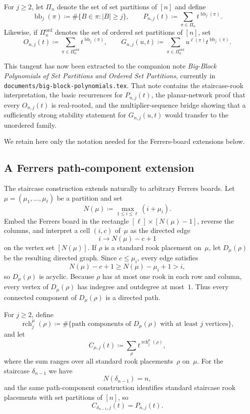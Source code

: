 \documentclass[11pt,reqno]{amsart}
\theoremstyle{definition}
\begin{document}
For $j \geq 2$, let $\Pi_n$ denote the set of set partitions of $[n]$ and define
\[
  \operatorname{bb}_j(\pi)
  \coloneqq
  \#\{B \in \pi : |B| \geq j\},
  \qquad
  P_{n,j}(t)
  \coloneqq
  \sum_{\pi \in \Pi_n} t^{\operatorname{bb}_j(\pi)}.
\]
Likewise, if $\Pi_n^{\operatorname{ord}}$ denotes the set of ordered set
partitions of $[n]$, set
\[
  O_{n,j}(t)
  \coloneqq
  \sum_{\pi \in \Pi_n^{\operatorname{ord}}} t^{\operatorname{bb}_j(\pi)},
  \qquad
  G_{n,j}(u,t)
  \coloneqq
  \sum_{\pi \in \Pi_n^{\operatorname{ord}}}
  u^{\ell(\pi)} t^{\operatorname{bb}_j(\pi)}.
\]

This tangent has now been extracted to the companion note
\emph{Big-Block Polynomials of Set Partitions and Ordered Set Partitions},
currently in \texttt{documents/big-block-polynomials.tex}. That note contains the
staircase-rook interpretation, the basic recurrences for \(P_{n,j}(t)\), the
planar-network proof that every \(O_{n,j}(t)\) is real-rooted, and the
multiplier-sequence bridge showing that a sufficiently strong stability
statement for \(G_{n,j}(u,t)\) would transfer to the unordered family.

We retain here only the notation needed for the Ferrers-board extensions below.

\subsection{A Ferrers path-component extension}

The staircase construction extends naturally to arbitrary Ferrers boards.
Let $\mu = (\mu_1,\dotsc,\mu_\ell)$ be a partition and set
\[
  N(\mu) \coloneqq \max_{1 \leq i \leq \ell} (i + \mu_i).
\]
Embed the Ferrers board in the rectangle
$[\ell] \times [N(\mu)-1]$, reverse the columns, and interpret a cell
$(i,c)$ of~$\mu$ as the directed edge
\[
  i \longrightarrow N(\mu) - c + 1
\]
on the vertex set $[N(\mu)]$.
If $\rho$ is a standard rook placement on~$\mu$, let $D_\mu(\rho)$ be the
resulting directed graph.
Since $c \leq \mu_i$, every edge satisfies
\[
  N(\mu) - c + 1 \geq N(\mu) - \mu_i + 1 > i,
\]
so $D_\mu(\rho)$ is acyclic.
Because $\rho$ has at most one rook in each row and column, every vertex of
$D_\mu(\rho)$ has indegree and outdegree at most~$1$. Thus every connected
component of $D_\mu(\rho)$ is a directed path.

For $j \geq 2$, define
\[
  \operatorname{rch}^{\mu}_j(\rho)
  \coloneqq
  \#\{\text{path components of $D_\mu(\rho)$ with at least $j$ vertices}\},
\]
and let
\[
  C_{\mu,j}(t)
  \coloneqq
  \sum_{\rho} t^{\operatorname{rch}^{\mu}_j(\rho)},
\]
where the sum ranges over all standard rook placements~$\rho$ on~$\mu$.
For the staircase $\delta_{n-1}$ we have
\[
  N(\delta_{n-1}) = n,
\]
and the same path-component construction identifies standard staircase rook
placements with set partitions of $[n]$, so
\[
  C_{\delta_{n-1},j}(t) = P_{n,j}(t).
\]
\end{document}

